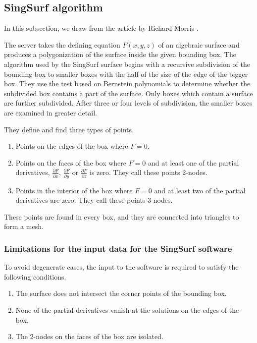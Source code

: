 \subsection{SingSurf algorithm}
In this subsection, we draw from the article by Richard Morris \cite{morris2003client}.

The server takes the defining equation $F(x, y, z)$ of an algebraic surface and 
produces a polygonization of the surface inside the given bounding box.
The algorithm used by the SingSurf surface begins with a recursive subdivision of
the bounding box to smaller boxes with the half of the size of the edge of the bigger box. 
They use the test based 
on Bernstein polynomials to determine whether the subdivided box contains a part of
the surface. Only boxes which contain a surface are further subdivided.
After three or four levels of subdivision, the smaller boxes are examined in greater detail.

They define and find three types of points.
\begin{enumerate}
    \item{Points on the edges of the box where $F=0$.}
    \item{Points on the faces of the box where $F=0$ and at least one of the partial
    derivatives, $\frac{\partial F}{\partial x}$, $\frac{\partial F}{\partial y}$
    or $\frac{\partial F}{\partial z}$ is zero. They call these points 2-nodes.}
    \item{Points in the interior of the box where $F=0$ and at least two of the
    partial derivatives are zero. They call these points 3-nodes.}
\end{enumerate}

These points are found in every box, and they are connected into triangles to form 
a mesh.

\subsubsection*{Limitations for the input data for the SingSurf software}
To avoid degenerate cases, the input to the
software is required to satisfy the following conditions.
\begin{enumerate}
    \item {The surface does not intersect the corner points of the bounding box.}
    \item {None of the partial derivatives vanish at the solutions on the edges of the box.}
    \item {The 2-nodes on the faces of the box are isolated.}
\end{enumerate}

